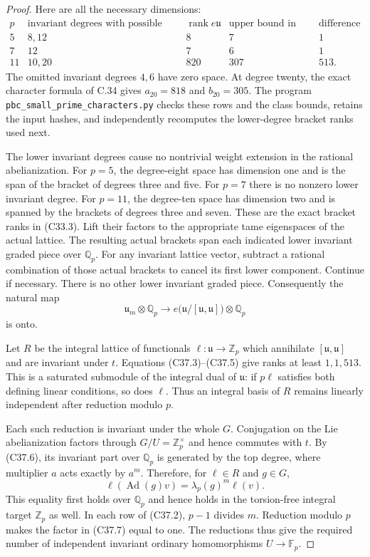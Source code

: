\begin{proof}
Here are all the necessary dimensions:
\[
\begin{array}{c|c|r|r|r}
p&\text{invariant degrees with possible nonzero space}
 &\operatorname{rank}e\mathfrak u
 &\text{upper bound in (C37.4)}&\text{difference}\\ \hline
5&8,12&8&7&1\\
7&12&7&6&1\\
11&10,20&820&307&513 .
\end{array}                                                     \tag{C37.5}
\]
The omitted invariant degrees $4,6$ have zero space.
At degree twenty, the exact character formula of C.34
gives $a_{20}=818$ and $b_{20}=305$.
The program \texttt{pbc\_small\_prime\_characters.py}
checks these rows and the class bounds, retains the
input hashes, and independently recomputes the
lower-degree bracket ranks used next.

The lower invariant degrees cause no nontrivial
weight extension in the rational abelianization.
For $p=5$, the degree-eight space has dimension one
and is the span of the bracket of degrees three and
five.  For $p=7$ there is no nonzero lower invariant
degree.  For $p=11$, the degree-ten space has
dimension two and is spanned by the brackets of
degrees three and seven.
These are the exact bracket ranks in (C33.3).
Lift their factors to the appropriate tame eigenspaces
of the actual lattice.
The resulting actual brackets span each indicated
lower invariant graded piece over $\mathbb Q_p$.
For any invariant lattice vector, subtract a rational
combination of those actual brackets to cancel its
first lower component.  Continue if necessary.
There is no other lower invariant graded piece.
Consequently the natural map
\[
 \mathfrak u_m\otimes\mathbb Q_p
 \longrightarrow
      e\bigl(\mathfrak u/[\mathfrak u,\mathfrak u]\bigr)
                      \otimes\mathbb Q_p
                                                               \tag{C37.6}
\]
is onto.

Let $R$ be the integral lattice of functionals
$\ell:\mathfrak u\to\mathbb Z_p$ which annihilate
$[\mathfrak u,\mathfrak u]$ and are invariant under
$t$.  Equations (C37.3)--(C37.5) give ranks at least
$1,1,513$.
This is a saturated submodule of the integral dual
of $\mathfrak u$: if $p\ell$ satisfies both defining
linear conditions, so does $\ell$.
Thus an integral basis of $R$ remains linearly
independent after reduction modulo $p$.

Each such reduction is invariant under the whole $G$.
Conjugation on the Lie abelianization factors through
$G/U=\mathbb Z_p^\times$ and hence commutes with $t$.
By (C37.6), its invariant part over $\mathbb Q_p$
is generated by the top degree, where multiplier
$a$ acts exactly by $a^m$.
Therefore, for $\ell\in R$ and $g\in G$,
\[
          \ell(\operatorname{Ad}(g)v)=
                         \lambda_p(g)^m\ell(v).                 \tag{C37.7}
\]
This equality first holds over $\mathbb Q_p$ and
hence holds in the torsion-free integral target
$\mathbb Z_p$ as well.
In each row of (C37.2), $p-1$ divides $m$.
Reduction modulo $p$ makes the factor in (C37.7)
equal to one.
The reductions thus give the required number of
independent invariant ordinary homomorphisms
$U\to\mathbb F_p$.


\end{proof}
